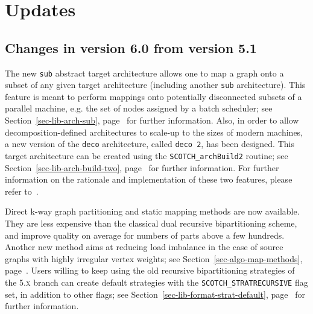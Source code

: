 
\section{Updates}
\label{sec-changes}

\subsection{Changes in version 6.0 from version 5.1}

The new \texttt{sub} abstract target architecture allows one to map a
graph onto a subset of any given target architecture (including
another \texttt{sub} architecture). This feature is meant to perform
mappings onto potentially disconnected subsets of a parallel machine,
e.g. the set of nodes assigned by a batch scheduler; see
Section~\ref{sec-lib-arch-sub}, page~\pageref{sec-lib-arch-sub} for
further information.
Also, in order to allow decomposition-defined architectures to
scale-up to the sizes of modern machines, a new version of the
\texttt{deco} architecture, called \texttt{deco~2}, has been
designed. This target architecture can be created using the 
\texttt{SCOTCH\_\lbt arch\lbt Build2} routine; see
Section~\ref{sec-lib-arch-build-two},
page~\pageref{sec-lib-arch-build-two} for further information.
For further information on the rationale and implementation of these
two features, please refer to~\cite{pellegrini:hal-01671156}.

Direct k-way graph partitioning and static mapping methods are now
available. They are less expensive than the classical dual recursive
bipartitioning scheme, and improve quality on average for numbers of
parts above a few hundreds. Another new method aims at reducing load
imbalance in the case of source graphs with highly irregular vertex
weights; see Section~\ref{sec-algo-map-methods},
page~\pageref{sec-algo-map-methods}. Users willing to keep using the
old recursive bipartitioning strategies of the \textsc{5.x} branch can
create default strategies with the \texttt{SCOTCH\_\lbt STRATRECURSIVE}
flag set, in addition to other flags; see
Section~\ref{sec-lib-format-strat-default},
page~\pageref{sec-lib-format-strat-default} for further information.

